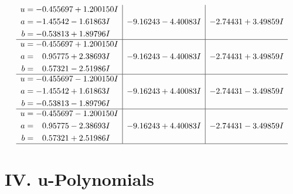 \documentclass[1p]{elsarticle_modified}
\theoremstyle{definition}
\begin{document}
$$\begin{array}{c|c|c}
\begin{aligned}
u &= -0.455697 + 1.200150 I \\
a &= -1.45542 - 1.61863 I \\
b &= -0.53813 + 1.89796 I\end{aligned}
 & -9.16243 - 4.40083 I & -2.74431 + 3.49859 I \\ \hline\begin{aligned}
u &= -0.455697 + 1.200150 I \\
a &= \phantom{-}0.95775 + 2.38693 I \\
b &= \phantom{-}0.57321 - 2.51986 I\end{aligned}
 & -9.16243 - 4.40083 I & -2.74431 + 3.49859 I \\ \hline\begin{aligned}
u &= -0.455697 - 1.200150 I \\
a &= -1.45542 + 1.61863 I \\
b &= -0.53813 - 1.89796 I\end{aligned}
 & -9.16243 + 4.40083 I & -2.74431 - 3.49859 I \\ \hline\begin{aligned}
u &= -0.455697 - 1.200150 I \\
a &= \phantom{-}0.95775 - 2.38693 I \\
b &= \phantom{-}0.57321 + 2.51986 I\end{aligned}
 & -9.16243 + 4.40083 I & -2.74431 - 3.49859 I\\
 \hline 
 \end{array}$$\newpage
\newpage\renewcommand{\arraystretch}{1}
\centering \section*{ IV. u-Polynomials}
\end{document}
